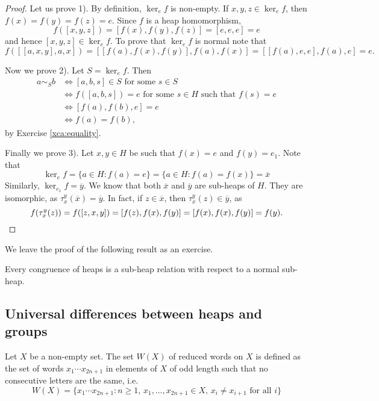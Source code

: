 \documentclass{svmult}
\begin{document}
\begin{proof}
    Let us prove 1). By definition, $\ker_ef$ is non-empty. If $x,y,z\in\ker_ef$, then 
    $f(x)=f(y)=f(z)=e$. Since $f$ is a heap homomorphism, 
    \[
    f([x,y,z])=[f(x),f(y),f(z)]=[e,e,e]=e
    \]
    and hence $[x,y,z]\in\ker_ef$. To prove that $\ker_ef$ is normal
    note that
    \[
    f\left(\left[ [a,x,y],a,x\right]\right)
    =\left[ [f(a),f(x),f(y)],f(a),f(x)\right]
    =\left[ [f(a),e, e],f(a),e\right]=e.
    \]
    
    Now we prove 2). Let $S=\ker_ef$. Then 
    \begin{align*}
        a\sim_Sb &\Longleftrightarrow [a,b,s]\in S\text{ for some $s\in S$}\\
        & \Longleftrightarrow f([a,b,s])=e\text{ for some $s\in H$ such that $f(s)=e$}\\
        & \Longleftrightarrow [f(a),f(b),e]=e\\
        & \Longleftrightarrow f(a)=f(b),
    \end{align*}
    by Exercise \ref{xca:equality}. 
    
    Finally we prove 3). Let $x,y\in H$ be such that $f(x)=e$ and $f(y)=e_1$. 
    Note that
    \[
    \ker_ef=\{a\in H:f(a)=e\}=\{a\in H:f(a)=f(x)\}=\overline{x}
    \]
    Similarly, $\ker_{e_1}f=\overline{y}$. We know that both $\overline{x}$ and
    $\overline{y}$ are sub-heaps of $H$. They are isomorphic, 
    as $\tau_x^y(\overline{x})=\overline{y}$. In fact, if $z\in\overline{x}$, 
    then $\tau_x^y(z)\in\overline{y}$, as 
    \[
    f(\tau_x^y(z))=f([z,x,y])=[f(z),f(x),f(y)]=[f(x),f(x),f(y)]=f(y).\qedhere 
    \]
\end{proof}

We leave the proof of the following result as an exercise. 

\begin{corollary}
    Every congruence of heaps is a sub-heap relation with respect to a normal sub-heap.  
\end{corollary}

\subsection{Universal differences between heaps and groups} 

Let $X$ be a non-empty set. The set $W(X)$ of reduced words on $X$ 
is defined as the set of words 
$x_1\cdots x_{2n+1}$ in elements of $X$ of odd length such that no
consecutive letters are the same, i.e. 
\[
W(X)=\{x_1\cdots x_{2n+1}:n\geq1,\,x_1,\dots,x_{2n+1}\in X,\,x_i\ne x_{i+1}\text{ for all $i$}\}
\]
\end{document}
